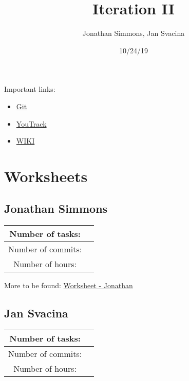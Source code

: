 \documentclass{article}
\title{Iteration II}
\date{10/24/19}
\author{Jonathan Simmons, Jan Svacina}
\begin{document}
    \maketitle

    Important links:

    \begin{itemize}
        \item \href{https://github.com/johnsimmons2/heuristic-dl/commits/master}{Git}
        \item \href{https://seer.ecs.baylor.edu/youtrack/agiles/94-11/95-11}{YouTrack}
        \item \href{https://github.com/johnsimmons2/heuristic-dl/wiki}{WIKI}
    \end{itemize}

    \section{Worksheets}

    \subsection*{Jonathan Simmons}

    \begin{center}
        \begin{tabular}{||c c ||}
            \hline
            Number of tasks: &  \\
            \hline
            Number of commits: &  \\
            \hline
            Number of hours: &  \\
            \hline
        \end{tabular}
    \end{center}

    More to be found: \href{https://github.com/johnsimmons2/heuristic-dl/wiki/Worksheet:-Jonathan}{Worksheet -
    Jonathan}

    \subsection*{Jan Svacina}

    \begin{center}
        \begin{tabular}{||c c ||}
            \hline
            Number of tasks: &  \\
            \hline
            Number of commits: &  \\
            \hline
            Number of hours: &  \\
            \hline
        \end{tabular}
    \end{center}
\end{document}
